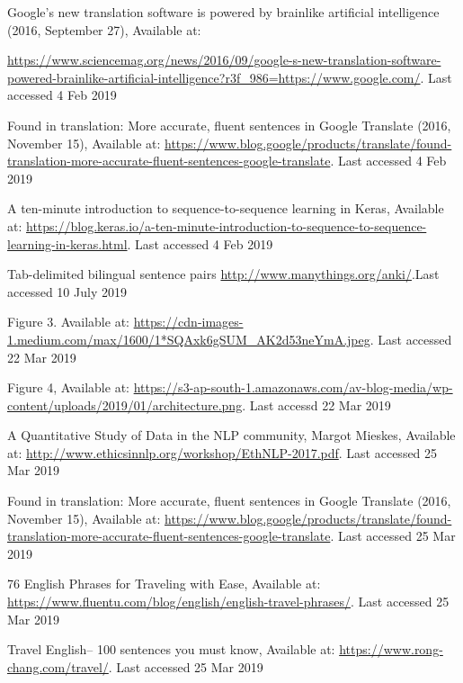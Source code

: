 \documentclass[runningheads]{llncs}
\begin{document}
	
\begin{thebibliography}{8}
	
	
	\sloppy
	Google’s new translation software is powered by brainlike artificial intelligence (2016, September 27), Available at:

	\url{https://www.sciencemag.org/news/2016/09/google-s-new-translation-software-powered-brainlike-artificial-intelligence?r3f\_986=https://www.google.com/}.  Last accessed 4 Feb 2019
	
	
	Found in translation: More accurate, fluent sentences in Google Translate (2016, November 15), Available at: \url{https://www.blog.google/products/translate/found-translation-more-accurate-fluent-sentences-google-translate}.  Last accessed 4 Feb 2019

	A ten-minute introduction to sequence-to-sequence learning in Keras, Available at: \url{https://blog.keras.io/a-ten-minute-introduction-to-sequence-to-sequence-learning-in-keras.html}.  Last accessed 4 Feb 2019

	Tab-delimited bilingual sentence pairs \url{http://www.manythings.org/anki/}.Last accessed  10 July 2019
		
	Figure 3. Available at: \url{https://cdn-images-1.medium.com/max/1600/1*SQAxk6gSUM_AK2d53neYmA.jpeg}. Last accessed 22 Mar 2019

	Figure 4, Available at: \url{https://s3-ap-south-1.amazonaws.com/av-blog-media/wp-content/uploads/2019/01/architecture.png}. Last accessd 22 Mar 2019
	
	A Quantitative Study of Data in the NLP community, Margot Mieskes, Available at: \url{http://www.ethicsinnlp.org/workshop/EthNLP-2017.pdf}.  Last accessed 25 Mar 2019

	Found in translation: More accurate, fluent sentences in Google Translate (2016, November 15), Available at: \url{https://www.blog.google/products/translate/found-translation-more-accurate-fluent-sentences-google-translate}.  Last accessed 25 Mar 2019

	76 English Phrases for Traveling with Ease, Available at: \url{https://www.fluentu.com/blog/english/english-travel-phrases/}.  Last accessed 25 Mar 2019

	Travel English-- 100 sentences you must know, Available at: \url{https://www.rong-chang.com/travel/}.  Last accessed 25 Mar 2019


\end{thebibliography}
\end{document}
